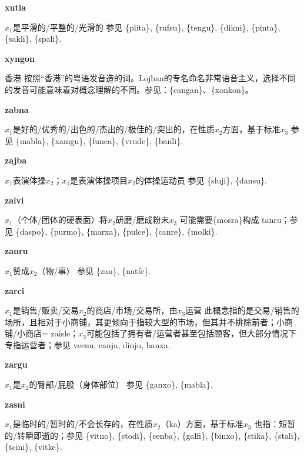 \documentclass[notitlepage,twocolumn,a4paper,10pt]{book}
\begin{document}
{\sffamily\bfseries xutla}\enspace {\ttfamily\bfseries[xul]}  $x_1$是平滑的\slash{}平整的\slash{}光滑的 \textemdash{} 参见 \{plita\}, \{rufsu\}, \{tengu\}, \{dikni\}, \{pinta\}, \{sakli\}, \{spali\}.

{\sffamily\bfseries xyngon} 香港 \textemdash{} 按照“香港”的粤语发音造的词。Lojban的专名命名非常语音主义，选择不同的发音可能意味着对概念理解的不同。参见：\{cangan\}、\{xonkon\}。

{\sffamily\bfseries zabna}\enspace {\ttfamily\bfseries[zan     za'a]}  $x_1$是好的\slash{}优秀的\slash{}出色的\slash{}杰出的\slash{}极佳的\slash{}突出的，在性质$x_2$方面，基于标准$x_3$ \textemdash{} 参见 \{mabla\}, \{xamgu\}, \{funca\}, \{vrude\}, \{banli\}.

{\sffamily\bfseries zajba}\enspace {\ttfamily\bfseries[zaj]}  $x_1$表演体操$x_2$；$x_1$是表演体操项目$x_2$的体操运动员 \textemdash{} 参见 \{sluji\}, \{dansu\}.

{\sffamily\bfseries zalvi}\enspace {\ttfamily\bfseries[zal]}  $x_1$（个体\slash{}团体的硬表面）将$x_2$研磨\slash{}磨成粉末$x_3$ \textemdash{} 可能需要\{mosra\}构成 tanru；参见 \{daspo\}, \{purmo\}, \{marxa\}, \{pulce\}, \{canre\}, \{molki\}.

{\sffamily\bfseries zanru}  $x_1$赞成$x_2$（物\slash{}事） \textemdash{} 参见 \{zau\}, \{natfe\}.

{\sffamily\bfseries zarci}  $x_1$是销售\slash{}贩卖\slash{}交易$x_2$的商店\slash{}市场\slash{}交易所，由$x_3$运营 \textemdash{} 此概念指的是交易\slash{}销售的场所，且相对于小商铺，其更倾向于指较大型的市场，但其并不排除前者；小商铺\slash{}小商店= {zaisle}；$x_3$可能包括了拥有者\slash{}运营者甚至包括顾客，但大部分情况下专指运营者；参见 {vecnu}, {canja}, {dinju}, {banxa}.

{\sffamily\bfseries zargu}\enspace {\ttfamily\bfseries[zag     za'u]}  $x_1$是$x_2$的臀部\slash{}屁股（身体部位） \textemdash{} 参见 \{ganxo\}, \{mabla\}.

{\sffamily\bfseries zasni}\enspace {\ttfamily\bfseries[zas]}  $x_1$是临时的\slash{}暂时的\slash{}不会长存的，在性质$x_2$（ka）方面，基于标准$x_3$ \textemdash{} 也指：短暂的\slash{}转瞬即逝的；参见 \{vitno\}, \{stodi\}, \{cenba\}, \{galfi\}, \{binxo\}, \{stika\}, \{stali\}, \{tcini\}, \{vitke\}.
\end{document}
